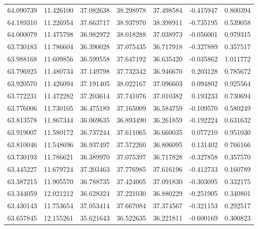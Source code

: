 \begin{tabular}{rrrrrrr}
 64.090739 &  11.426100 &         37.082638 &         38.298978 &         37.498584 & -0.415947 &  0.800394 \\
 64.189310 &  11.226954 &         37.663717 &         38.937970 &         38.398911 & -0.735195 &  0.539058 \\
 64.000079 &  11.475798 &         36.982972 &         38.018288 &         37.038973 & -0.056001 &  0.979315 \\
 63.730183 &  11.786604 &         36.390028 &         37.075435 &         36.717918 & -0.327889 &  0.357517 \\
 63.988168 &  11.609856 &         36.599558 &         37.647192 &         36.635420 & -0.035862 &  1.011772 \\
 63.796925 &  11.480734 &         37.149798 &         37.732342 &         36.946670 &  0.203128 &  0.785672 \\
 63.920570 &  11.426094 &         37.191405 &         38.022167 &         37.096603 &  0.094802 &  0.925564 \\
 63.772231 &  11.472282 &         37.203614 &         37.741076 &         37.010382 &  0.193233 &  0.730694 \\
 63.776006 &  11.730105 &         36.475189 &         37.165009 &         36.584759 & -0.109570 &  0.580249 \\
 63.813578 &  11.867344 &         36.069635 &         36.893490 &         36.261859 & -0.192224 &  0.631632 \\
 63.919007 &  11.580172 &         36.737244 &         37.611065 &         36.660035 &  0.077210 &  0.951030 \\
 63.810046 &  11.548696 &         36.937497 &         37.572260 &         36.806095 &  0.131402 &  0.766166 \\
 63.730193 &  11.786621 &         36.389970 &         37.075397 &         36.717828 & -0.327858 &  0.357570 \\
 63.445227 &  11.679724 &         37.203463 &         37.776985 &         37.616196 & -0.412733 &  0.160789 \\
 63.387215 &  11.905570 &         36.788735 &         37.424005 &         37.091830 & -0.303095 &  0.332175 \\
 63.344059 &  12.021212 &         36.628324 &         37.221030 &         36.880229 & -0.251905 &  0.340801 \\
 63.430143 &  11.753654 &         37.053414 &         37.667084 &         37.374567 & -0.321153 &  0.292517 \\
 63.657845 &  12.155261 &         35.621643 &         36.522635 &         36.221811 & -0.600169 &  0.300823 \\

\end{tabular}
